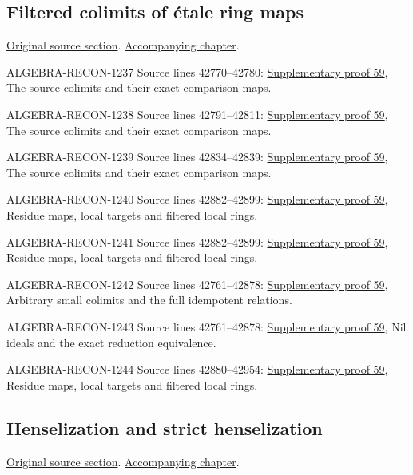 \subsection{Filtered colimits of \'etale ring maps}
\hypertarget{algebra-source-section-ind-etale}{}
\noindent\href{https://github.com/stacks/stacks-project/blob/a04446e57ec1fbc252a871afcec7752fb2807b14/algebra.tex\#L42761}{Original source section}. \href{algebra.pdf\#nameddest=section-ind-etale}{Accompanying chapter}.

\begin{AlgebraSourceRoutes}
\item[ALGEBRA-RECON-1237] Source lines 42770--42780: \hyperlink{algebra_indetale_notes_20260929}{Supplementary proof 59}, The source colimits and their exact comparison maps.
\item[ALGEBRA-RECON-1238] Source lines 42791--42811: \hyperlink{algebra_indetale_notes_20260929}{Supplementary proof 59}, The source colimits and their exact comparison maps.
\item[ALGEBRA-RECON-1239] Source lines 42834--42839: \hyperlink{algebra_indetale_notes_20260929}{Supplementary proof 59}, The source colimits and their exact comparison maps.
\item[ALGEBRA-RECON-1240] Source lines 42882--42899: \hyperlink{algebra_indetale_notes_20260929}{Supplementary proof 59}, Residue maps, local targets and filtered local rings.
\item[ALGEBRA-RECON-1241] Source lines 42882--42899: \hyperlink{algebra_indetale_notes_20260929}{Supplementary proof 59}, Residue maps, local targets and filtered local rings.
\item[ALGEBRA-RECON-1242] Source lines 42761--42878: \hyperlink{algebra_indetale_notes_20260929}{Supplementary proof 59}, Arbitrary small colimits and the full idempotent relations.
\item[ALGEBRA-RECON-1243] Source lines 42761--42878: \hyperlink{algebra_indetale_notes_20260929}{Supplementary proof 59}, Nil ideals and the exact reduction equivalence.
\item[ALGEBRA-RECON-1244] Source lines 42880--42954: \hyperlink{algebra_indetale_notes_20260929}{Supplementary proof 59}, Residue maps, local targets and filtered local rings.
\end{AlgebraSourceRoutes}

\subsection{Henselization and strict henselization}
\hypertarget{algebra-source-section-henselization}{}
\noindent\href{https://github.com/stacks/stacks-project/blob/a04446e57ec1fbc252a871afcec7752fb2807b14/algebra.tex\#L42959}{Original source section}. \href{algebra.pdf\#nameddest=section-henselization}{Accompanying chapter}.

